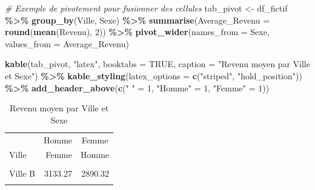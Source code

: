 \documentclass[
]{article}
\newenvironment{Shaded}{\begin{snugshade}}{\end{snugshade}}
\newcommand{\AttributeTok}[1]{\textcolor[rgb]{0.13,0.29,0.53}{#1}}
\newcommand{\CommentTok}[1]{\textcolor[rgb]{0.56,0.35,0.01}{\textit{#1}}}
\newcommand{\ConstantTok}[1]{\textcolor[rgb]{0.56,0.35,0.01}{#1}}
\newcommand{\DecValTok}[1]{\textcolor[rgb]{0.00,0.00,0.81}{#1}}
\newcommand{\FunctionTok}[1]{\textcolor[rgb]{0.13,0.29,0.53}{\textbf{#1}}}
\newcommand{\NormalTok}[1]{#1}
\newcommand{\OtherTok}[1]{\textcolor[rgb]{0.56,0.35,0.01}{#1}}
\newcommand{\SpecialCharTok}[1]{\textcolor[rgb]{0.81,0.36,0.00}{\textbf{#1}}}
\newcommand{\StringTok}[1]{\textcolor[rgb]{0.31,0.60,0.02}{#1}}
\begin{document}
\begin{Shaded}
\begin{Highlighting}[]
\CommentTok{\# Exemple de pivotement pour fusionner des cellules}
\NormalTok{tab\_pivot }\OtherTok{\textless{}{-}}\NormalTok{ df\_fictif }\SpecialCharTok{\%\textgreater{}\%}
  \FunctionTok{group\_by}\NormalTok{(Ville, Sexe) }\SpecialCharTok{\%\textgreater{}\%}
  \FunctionTok{summarise}\NormalTok{(}\AttributeTok{Average\_Revenu =} \FunctionTok{round}\NormalTok{(}\FunctionTok{mean}\NormalTok{(Revenu), }\DecValTok{2}\NormalTok{)) }\SpecialCharTok{\%\textgreater{}\%}
  \FunctionTok{pivot\_wider}\NormalTok{(}\AttributeTok{names\_from =}\NormalTok{ Sexe, }\AttributeTok{values\_from =}\NormalTok{ Average\_Revenu)}

\FunctionTok{kable}\NormalTok{(tab\_pivot, }\StringTok{"latex"}\NormalTok{, }\AttributeTok{booktabs =} \ConstantTok{TRUE}\NormalTok{, }\AttributeTok{caption =} \StringTok{"Revenu moyen par Ville et Sexe"}\NormalTok{) }\SpecialCharTok{\%\textgreater{}\%}
  \FunctionTok{kable\_styling}\NormalTok{(}\AttributeTok{latex\_options =} \FunctionTok{c}\NormalTok{(}\StringTok{"striped"}\NormalTok{, }\StringTok{"hold\_position"}\NormalTok{)) }\SpecialCharTok{\%\textgreater{}\%}
  \FunctionTok{add\_header\_above}\NormalTok{(}\FunctionTok{c}\NormalTok{(}\StringTok{" "} \OtherTok{=} \DecValTok{1}\NormalTok{, }\StringTok{"Homme"} \OtherTok{=} \DecValTok{1}\NormalTok{, }\StringTok{"Femme"} \OtherTok{=} \DecValTok{1}\NormalTok{))}
\end{Highlighting}
\end{Shaded}

\begin{table}[!h]
\centering
\caption{\label{tab:tableau-fusion}Revenu moyen par Ville et Sexe}
\centering
\begin{tabular}[t]{lrr}
\toprule
\multicolumn{1}{c}{ } & \multicolumn{1}{c}{Homme} & \multicolumn{1}{c}{Femme} \\
\cmidrule(l{3pt}r{3pt}){2-2} \cmidrule(l{3pt}r{3pt}){3-3}
Ville & Femme & Homme\\
\midrule
\cellcolor{gray!10}{Ville A} & \cellcolor{gray!10}{3135.71} & \cellcolor{gray!10}{3019.73}\\
Ville B & 3133.27 & 2890.32\\
\cellcolor{gray!10}{Ville C} & \cellcolor{gray!10}{3046.05} & \cellcolor{gray!10}{2986.11}\\
\bottomrule
\end{tabular}
\end{table}
\end{document}
